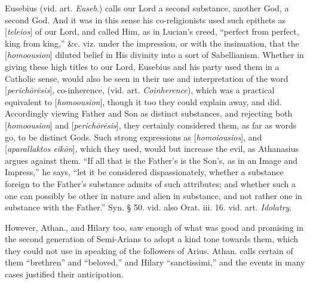 Eusebius (vid. art. \emph{Euseb}.) calls our Lord
a second substance, another God, a second God. And it was in this
sense his co-religionists used such epithets as [\emph{teleios}] of
our Lord, and called Him, as in Lucian's creed, ``perfect from perfect,
king from king,'' \&c. viz. under the impression, or with the
insinuation, that the [\emph{homoousion}] diluted belief in His
divinity into a sort of Sabellianism. Whether in giving these high
titles to our Lord, Eusebius and his party used them in a Catholic
sense, would also be seen in their use and interpretation of the word
[\emph{perich\={o}r\={e}sis}], co-inherence, (vid. art. \emph{Coinherence}),
which was a practical equivalent to [\emph{homoousion}], though it too
they could explain away, and did. Accordingly viewing Father and Son
as distinct substances, and rejecting both [\emph{homoousion}] and [\emph{perich\={o}r\={e}sis}],
they certainly considered them, as far as words go, to be distinct
Gods. Such strong expressions as [\emph{homoiousios}], and [\emph{aparallaktos
eik\={o}n}], which they used, would but increase the evil, as
Athanasius argues against them. ``If all that is the Father's is the
Son's, as in an Image and Impress,'' he says, ``let it be
considered dispassionately, whether a substance foreign to the Father's
substance admits of such attributes; and whether such a one can
possibly be other in nature and alien in substance, and not rather one
in substance with the Father.'' Syn. § 50. vid. also Orat. iii. 16.
vid. art. \emph{Idolatry}.

However, Athan., and Hilary too, saw enough of
what was good and promising in the second generation of Semi-Arians to
adopt a kind tone towards them, which they could not use in speaking
of the followers of Arius. Athan. calls certain of them ``brethren'' and ``beloved,'' and Hilary ``sanctissimi,'' and the events in many
cases justified their anticipation.

